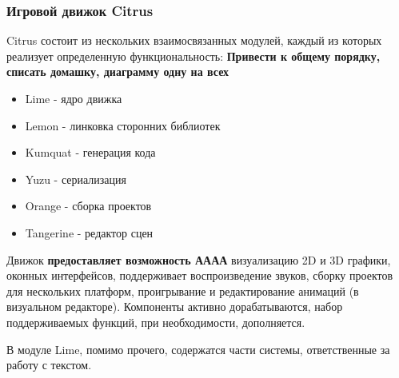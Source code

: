\documentclass{fefu}
\begin{document}
			\subsubsection{Игровой движок Citrus}
				\par Citrus состоит из нескольких взаимосвязанных модулей, каждый из которых
				реализует определенную функциональность: \cite{CitrusRepo}
				\textbf{Привести к общему порядку, списать домашку, диаграмму одну на всех}
				\begin{itemize}
					\item Lime - ядро движка
					\item Lemon - линковка сторонних библиотек
					\item Kumquat - генерация кода
					\item Yuzu - сериализация
					\item Orange - сборка проектов
					\item Tangerine - редактор сцен
				\end{itemize}
				\par Движок \textbf{предоставляет возможность АААА} визуализацию 2D и 3D графики, оконных интерфейсов,
				поддерживает воспроизведение звуков, сборку проектов для нескольких платформ,
				проигрывание и редактирование анимаций (в визуальном редакторе). Компоненты
				активно дорабатываются, набор поддерживаемых функций, при необходимости,
				дополняется.
				\par В модуле Lime, помимо прочего, содержатся части системы, ответственные за
				работу с текстом.
\end{document}
